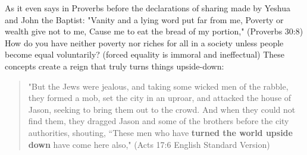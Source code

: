 \documentclass[11pt]{article}
\begin{document}
As it even says in Proverbs before the declarations of sharing made by Yeshua and John the Baptist: "Vanity and a lying word put far from me, Poverty or wealth give not to me, Cause me to eat the bread of my portion," (Proverbs 30:8)
How do you have neither poverty nor riches for all in a society unless people become equal voluntarily? (forced equality is immoral and ineffectual) These concepts create a reign that truly turns things upside-down:
\begin{quote}
"But the Jews were jealous, and taking some wicked men of the rabble, they formed a mob, set the city in an uproar, and attacked the house of Jason, seeking to bring them out to the crowd. And when they could not find them, they dragged Jason and some of the brothers before the city authorities, shouting, “These men who have  \textbf{turned the world upside down} have come here also," (Acts 17:6 English Standard Version)
\end{quote}
\end{document}

